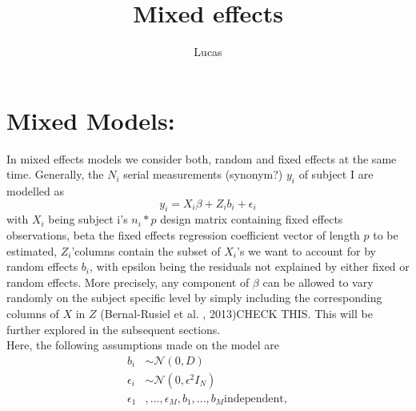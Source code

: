 \documentclass[a4paper,11pt]{article}
\begin{document}
 	

\title{Mixed effects}
\author{Lucas}
\maketitle

\section{Mixed Models:}

In mixed effects models we consider both, random and fixed effects at the same time. Generally, the 
$N_i$ serial measurements (synonym?) $y_i$ of subject I are modelled as
\begin{equation}
	y_i=X_i\beta + Z_ib_i +\epsilon_i
\end{equation}
with $X_i$ being subject i’s $n_i*p$  design matrix containing fixed effects observations, beta the fixed effects regression coefficient vector of length $p$ to be estimated, $Z_i$’columns contain the subset of $X_i$’s we want to account for by random effects $b_i$, with epsilon being the residuals not explained by either fixed or random effects. More precisely, any component of $\beta$ can be allowed to vary randomly on the subject specific level by simply including the corresponding columns of $X$ in $Z$ (Bernal-Rusiel et al. , 2013)CHECK THIS. This will be further explored in the subsequent sections.\\
Here, the following assumptions made on the model are 
\begin{align*}
b_i &\sim \mathcal{N}(0,D)\\
\epsilon _i &\sim \mathcal{N}(0,\epsilon^2I_N)\\
\epsilon_1&,...,\epsilon_M,b_1,...,b_M  \text{independent},
\end{align*}
\end{document}
